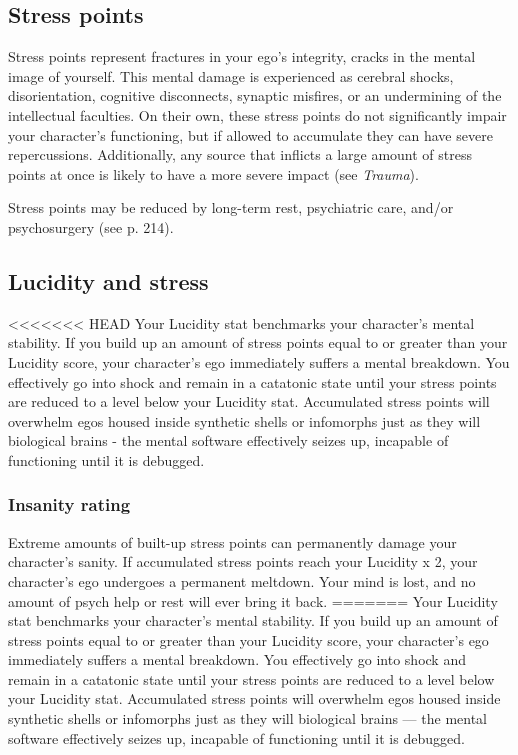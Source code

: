 \subsection{Stress points}
\label{sec:stress-points}

Stress points represent fractures in your ego’s integrity, cracks in the mental image of yourself. This mental damage is experienced as cerebral shocks, disorientation, cognitive disconnects, synaptic misfires, or an undermining of the intellectual faculties. On their own, these stress points do not significantly impair your character’s functioning, but if allowed to accumulate they can have severe repercussions. Additionally, any source that inflicts a large amount of stress points at once is likely to have a more severe impact (see \emph{Trauma}).

Stress points may be reduced by long-term rest, psychiatric care, and/or psychosurgery (see p. 214).


\subsection{Lucidity and stress}
\label{sec:lucidity-stress}

<<<<<<< HEAD
Your Lucidity stat benchmarks your character’s mental stability. If you build up an amount of stress points equal to or greater than your Lucidity score, your character’s ego immediately suffers a mental breakdown. You effectively go into shock and remain in a catatonic state until your stress points are reduced to a level below your Lucidity stat. Accumulated stress points will overwhelm egos housed inside synthetic shells or infomorphs just as they will biological brains - the mental software effectively seizes up, incapable of functioning until it is debugged.

\subsubsection{Insanity rating}

Extreme amounts of built-up stress points can permanently damage your character’s sanity. If accumulated stress points reach your Lucidity x 2, your character’s ego undergoes a permanent meltdown. Your mind is lost, and no amount of psych help or rest will ever bring it back.
=======
Your Lucidity stat benchmarks your character’s mental stability. If you build up an amount of stress points equal to or greater than your Lucidity score, your character’s ego immediately suffers a mental breakdown. You effectively go into shock and remain in a catatonic state until your stress points are reduced to a level below your Lucidity stat. Accumulated stress points will overwhelm egos housed inside synthetic shells or infomorphs just as they will biological brains --- the mental software effectively seizes up, incapable of functioning until it is debugged.

